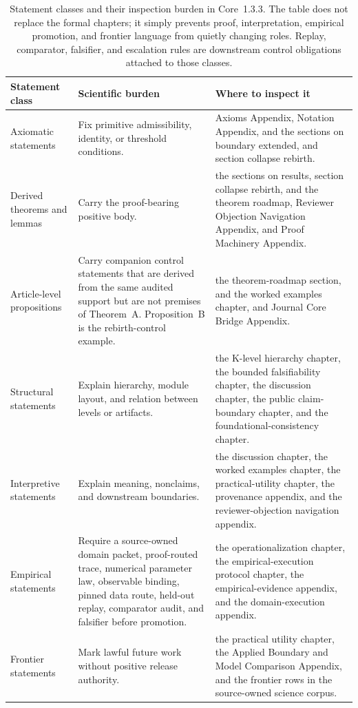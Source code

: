 \begin{table}[htbp]
\centering
\begingroup
\footnotesize
\RaggedRight
\setlength{\tabcolsep}{4pt}
\begin{tabular}{@{}L{0.21\textwidth}L{0.28\textwidth}L{0.39\textwidth}@{}}
\toprule
\textbf{Statement class} & \textbf{Scientific burden} & \textbf{Where to inspect it} \\
\midrule
Axiomatic statements & Fix primitive admissibility, identity, or threshold conditions. & Axioms Appendix, Notation Appendix, and the sections on boundary extended, and section collapse rebirth. \\
Derived theorems and lemmas & Carry the proof-bearing positive body. & the sections on results, section collapse rebirth, and the theorem roadmap, Reviewer Objection Navigation Appendix, and Proof Machinery Appendix. \\
Article-level propositions & Carry companion control statements that are derived from the same audited support but are not premises of Theorem~A. Proposition~B is the rebirth-control example. & the theorem-roadmap section, and the worked examples chapter, and Journal Core Bridge Appendix. \\
Structural statements & Explain hierarchy, module layout, and relation between levels or artifacts. & the K-level hierarchy chapter, the bounded falsifiability chapter, the discussion chapter, the public claim-boundary chapter, and the foundational-consistency chapter. \\
Interpretive statements & Explain meaning, nonclaims, and downstream boundaries. & the discussion chapter, the worked examples chapter, the practical-utility chapter, the provenance appendix, and the reviewer-objection navigation appendix. \\
Empirical statements & Require a source-owned domain packet, proof-routed trace, numerical parameter law, observable binding, pinned data route, held-out replay, comparator audit, and falsifier before promotion. & the operationalization chapter, the empirical-execution protocol chapter, the empirical-evidence appendix, and the domain-execution appendix. \\
Frontier statements & Mark lawful future work without positive release authority. & the practical utility chapter, the Applied Boundary and Model Comparison Appendix, and the frontier rows in the source-owned science corpus. \\
\bottomrule
\end{tabular}
\endgroup
\caption{Statement classes and their inspection burden in Core~1.3.3. The table
does not replace the formal chapters; it simply prevents proof, interpretation,
empirical promotion, and frontier language from quietly changing roles. Replay,
comparator, falsifier, and escalation rules are downstream control obligations
attached to those classes.}
\label{tab:oc13-statement-classes}
\end{table}

